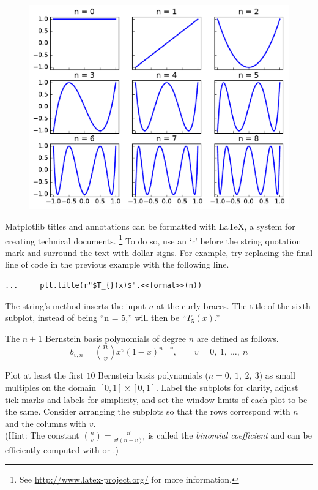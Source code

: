 \begin{figure}[H] %
    \centering
    \includegraphics[width=.7\linewidth]{figures/chebyshev_good.pdf}
\end{figure}

\begin{info} %
Matplotlib titles and annotations can be formatted with \LaTeX, a system for creating technical documents.%
\footnote{See \url{http://www.latex-project.org/} for more information.}
To do so, use an `r' before the string quotation mark and surround the text with dollar signs.
For example, try replacing the final line of code in the previous example with the following line.

\begin{lstlisting}
...     plt.title(r"$T_{}(x)$".<<format>>(n))
\end{lstlisting}

The string's  method inserts the input $n$ at the curly braces.
The title of the sixth subplot, instead of being ``n = 5,'' will then be ``$T_5(x)$.''
\end{info}


\begin{problem} %
The $n+1$ Bernstein basis polynomials of degree $n$ are defined as follows.
\[b_{v,n} = {{n} \choose {v}} x^v (1-x)^{n-v},\qquad v = 0,\ 1,\ \ldots,\ n\]

Plot at least the first $10$ Bernstein basis polynomials ($n = 0,\ 1,\ 2,\ 3$) as small multiples on the domain $[0,1] \times [0,1]$.
Label the subplots for clarity, adjust tick marks and labels for simplicity, and set the window limits of each plot to be the same.
Consider arranging the subplots so that the rows correspond with $n$ and the columns with $v$.
\\(Hint: The constant ${{n} \choose {v}} = \frac{n!}{v!(n-v)!}$ is called the \emph{binomial coefficient} and can be efficiently computed with  or .)
\end{problem}

